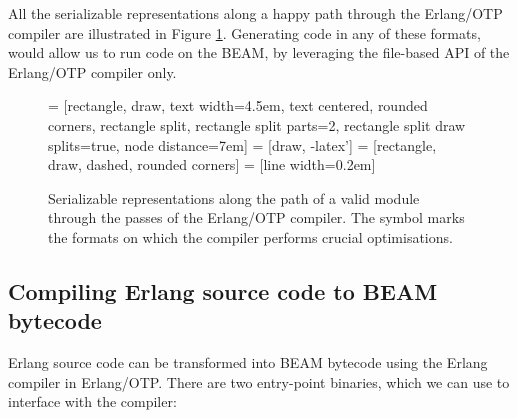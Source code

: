 All the serializable representations along a happy path through the
Erlang/OTP compiler are illustrated in Figure
\ref{fig:serializable-representations}. Generating code in any of
these formats, would allow us to run code on the BEAM, by leveraging
the file-based API of the Erlang/OTP compiler only. 

\NewDocumentCommand\optimizing{}{$\circlearrowright$}

\begin{figure}[h]
\centering
{} = [rectangle, draw, 
    text width=4.5em, text centered, rounded corners,
    rectangle split, rectangle split parts=2,
    rectangle split draw splits=true,
    node distance=7em]
 = [draw, -latex']
 = [rectangle, draw, dashed, rounded corners]
 = [line width=0.2em]


\caption{Serializable representations along the path of a valid module
through the passes of the Erlang/OTP compiler. The symbol
\optimizing{} marks the formats on which the compiler performs crucial
optimisations.}

\label{fig:serializable-representations}
\end{figure}

\subsection{Compiling Erlang source code to BEAM bytecode}

Erlang source code can be transformed into BEAM bytecode using the
Erlang compiler in Erlang/OTP. There are two entry-point binaries,
which we can use to interface with the compiler:

